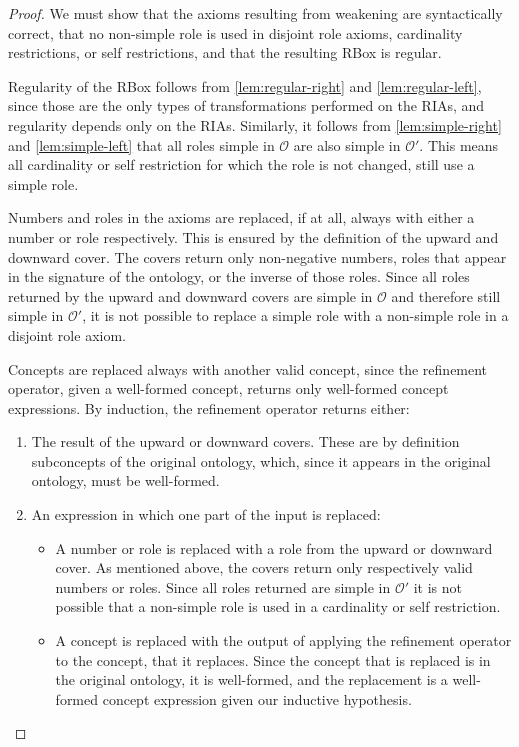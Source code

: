 \begin{proof}
We must show that the axioms resulting from weakening are syntactically correct, that no non-simple role is used in disjoint role axioms, cardinality restrictions, or self restrictions, and that the resulting RBox is regular.

Regularity of the RBox follows from \cref{lem:regular-right} and \cref{lem:regular-left}, since those are the only types of transformations performed on the RIAs, and regularity depends only on the RIAs. Similarly, it follows  from \cref{lem:simple-right} and \cref{lem:simple-left} that all roles simple in $\mathcal{O}$ are also simple in $\mathcal{O}'$. This means all cardinality or self restriction for which the role is not changed, still use a simple role.

Numbers and roles in the axioms are replaced, if at all, always with either a number or role respectively. This is ensured by the definition of the upward and downward cover. The covers return only non-negative numbers, roles that appear in the signature of the ontology, or the inverse of those roles. Since all roles returned by the upward and downward covers are simple in $\mathcal{O}$ and therefore still simple in $\mathcal{O}'$, it is not possible to replace a simple role with a non-simple role in a disjoint role axiom.

Concepts are replaced always with another valid concept, since the refinement operator, given a well-formed concept, returns only well-formed concept expressions.
By induction, the refinement operator returns either:

\begin{enumerate}[label=(\roman*)]
    \item The result of the upward or downward covers. These are by definition subconcepts of the original ontology, which, since it appears in the original ontology, must be well-formed.
    \item An expression in which one part of the input is replaced:
        \begin{itemize}
            \item A number or role is replaced with a role from the upward or downward cover. As mentioned above, the covers return only respectively valid numbers or roles. Since all roles returned are simple in $\mathcal{O}'$ it is not possible that a non-simple role is used in a cardinality or self restriction.
            \item A concept is replaced with the output of applying the refinement operator to the concept, that it replaces. Since the concept that is replaced is in the original ontology, it is well-formed, and the replacement is a well-formed concept expression given our inductive hypothesis.
        \end{itemize}
\end{enumerate}
\end{proof}
